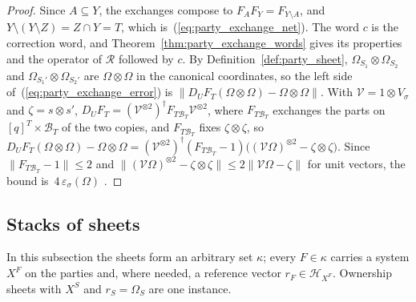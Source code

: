 \begin{proof}\leanok
    Since $A\subseteq Y$, the exchanges compose to $F_AF_Y=F_{Y\setminus A}$, and
    $Y\setminus(Y\setminus Z)=Z\cap Y=T$, which is~(\ref{eq:party_exchange_net}). The word $c$ is
    the correction word, and Theorem~\ref{thm:party_exchange_words} gives its properties and the
    operator of $\mathcal R$ followed by $c$. By Definition~\ref{def:party_sheet},
    $\Omega_{S_1}\otimes\Omega_{S_2}$ and $\Omega_{S_1'}\otimes\Omega_{S_2'}$ are $\Omega\otimes\Omega$
    in the canonical coordinates, so the left side of~(\ref{eq:party_exchange_error}) is
    $\lVert D_UF_T(\Omega\otimes\Omega)-\Omega\otimes\Omega\rVert$. With
    $\mathcal V=1\otimes V_\sigma$ and $\zeta=s\otimes s'$,
    $D_UF_T=(\mathcal V^{\otimes2})^\dagger F_{T\mathcal B_T}\mathcal V^{\otimes2}$, where
    $F_{T\mathcal B_T}$ exchanges the parts on $[q]^T\times\mathcal B_T$ of the two copies, and
    $F_{T\mathcal B_T}$ fixes $\zeta\otimes\zeta$, so
    $D_UF_T(\Omega\otimes\Omega)-\Omega\otimes\Omega=(\mathcal V^{\otimes2})^\dagger
        (F_{T\mathcal B_T}-1)\bigl((\mathcal V\Omega)^{\otimes2}-\zeta\otimes\zeta\bigr)$. Since
    $\lVert F_{T\mathcal B_T}-1\rVert\leq2$ and
    $\lVert(\mathcal V\Omega)^{\otimes2}-\zeta\otimes\zeta\rVert\leq
        2\lVert\mathcal V\Omega-\zeta\rVert$ for unit vectors, the bound
    is~$4\,\varepsilon_\sigma(\Omega)$ \cite[proof of Lemma~6.6]{OpenAI2026PolynomialPEPS}.
\end{proof}

\subsection{Stacks of sheets}

In this subsection the sheets form an arbitrary set $\kappa$; every $F\in\kappa$ carries a system
$X^F$ on the parties and, where needed, a reference vector $r_F\in\mathcal H_{X^F}$. Ownership
sheets with $X^S$ and $r_S=\Omega_S$ are one instance.


